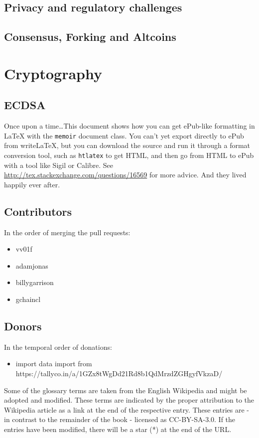 \documentclass[a4paper,12pt,oneside,openany]{book}
\begin{document}
\section{Privacy and regulatory challenges}
\section{Consensus, Forking and Altcoins}


\appendix
\chapter{Cryptography}
\section{ECDSA}

Once upon a time\ldots This document shows how you can get ePub-like formatting in \LaTeX{} with the \verb|memoir| document class. You can't yet export directly to ePub from writeLaTeX, but you can download the source and run it through a format conversion tool, such as \verb|htlatex| to get HTML, and then go from HTML to ePub with a tool like Sigil or Calibre. See \url{http://tex.stackexchange.com/questions/16569} for more advice. And they lived happily ever after.

\appendix
\section{Contributors}
In the order of merging the pull requests:
\begin{itemize}
\item vv01f
\item adamjonas
\item billygarrison
\item gchaincl
\end{itemize}

\section{Donors}
In the temporal order of donations:
\begin{itemize}
\item import data import from https://tallyco.in/a/1GZx8tWgDd21Rd8b1QdMrzdZGHgyfVkzaD/


\end{itemize}

\glsaddall

Some of the glossary terms are taken from the English Wikipedia and might be adopted and modified. These terms are indicated by the proper attribution to the Wikipedia article as a link at the end of the respective entry. These entries are - in contrast to the remainder of the book - licensed as CC-BY-SA-3.0. If the entries have been modified, there will be a star (*) at the end of the URL.

\printnoidxglossaries
\end{document}
